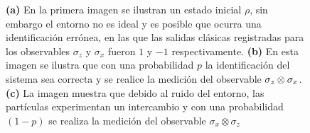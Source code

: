 \begin{figure}[H]

\begin{subfigure}{0.4\textwidth}
  \centering
{}
\hfill
\caption{}
\end{subfigure}
\caption{\textbf{(a)} En la primera imagen se ilustran un estado inicial $\rho$, sin embargo el entorno no es ideal y es posible que ocurra una identificación errónea, en las que las salidas clásicas registradas para los observables $\sigma_z$ y $\sigma_x$ fueron $1$ y $-1$ respectivamente.\textbf{ (b)} En esta imagen se ilustra que con una probabilidad $p$ la identificación del sistema sea correcta y se realice la medición del observable $\sigma_z\otimes \sigma_x$.\textbf{ (c)} La imagen muestra que debido al ruido del entorno, las partículas experimentan un intercambio y con una probabilidad $(1-p)$ se realiza la medición del observable $\sigma_x\otimes \sigma_z$ }\label{diagrama-cajas}
\end{figure}
